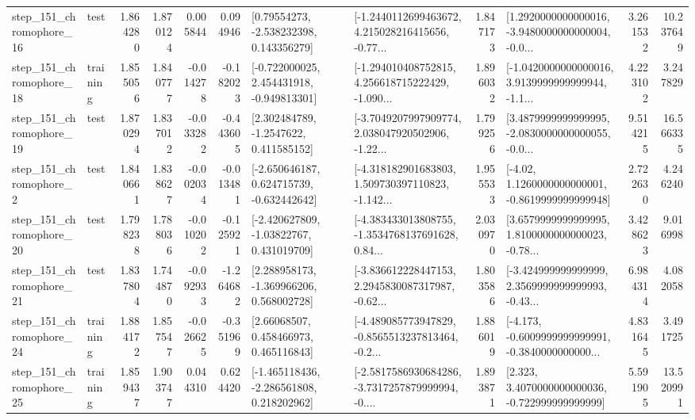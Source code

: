 \begin{tabular}{llrrrrllrlrr}
  step\_151\_chromophore\_16 &      test &      1.864280 &    1.870124 &      0.005844 &  0.094946 &     [0.79554273, -2.538232398, 0.143356279] &  [-1.2440112699463672, 4.215028216415656, -0.77... &       1.847173 &  [1.2920000000000016, -3.9480000000000004, -0.0... &            3.261532 &         10.237649 \\
  step\_151\_chromophore\_18 &  training &      1.855056 &    1.840777 &     -0.014278 & -0.182023 &   [-0.722000025, 2.454431918, -0.949813301] &  [-1.294010408752815, 4.256618715222429, -1.090... &       1.896032 &  [-1.0420000000000016, 3.9139999999999944, -1.1... &            4.223102 &          3.247829 \\
  step\_151\_chromophore\_19 &      test &      1.870294 &    1.837012 &     -0.033282 & -0.443605 &      [2.302484789, -1.2547622, 0.411585152] &  [-3.7049207997909774, 2.038047920502906, -1.22... &       1.799256 &  [3.4879999999999995, -2.0830000000000055, -0.0... &            9.514215 &         16.566335 \\
   step\_151\_chromophore\_2 &      test &      1.840661 &    1.838627 &     -0.002034 & -0.013481 &   [-2.650646187, 0.624715739, -0.632442642] &  [-4.318182901683803, 1.509730397110823, -1.142... &       1.955533 &   [-4.02, 1.1260000000000001, -0.8619999999999948] &            2.722630 &          4.246240 \\
  step\_151\_chromophore\_20 &      test &      1.798238 &    1.788036 &     -0.010202 & -0.125921 &    [-2.420627809, -1.03822767, 0.431019709] &  [-4.383433013808755, -1.3534768137691628, 0.84... &       2.030970 &  [3.6579999999999995, 1.8100000000000023, -0.78... &            3.428623 &          9.016998 \\
  step\_151\_chromophore\_21 &      test &      1.837804 &    1.744870 &     -0.092933 & -1.264682 &    [2.288958173, -1.369966206, 0.568002728] &  [-3.836612228447153, 2.2945830087317987, -0.62... &       1.803586 &  [-3.424999999999999, 2.3569999999999993, -0.43... &            6.984314 &          4.082058 \\
  step\_151\_chromophore\_24 &  training &      1.884172 &    1.857547 &     -0.026625 & -0.351969 &      [2.66068507, 0.458466973, 0.465116843] &  [-4.489085773947829, -0.8565513237813464, -0.2... &       1.886019 &  [-4.173, -0.6009999999999991, -0.3840000000000... &            4.831645 &          3.491725 \\
  step\_151\_chromophore\_25 &  training &      1.859437 &    1.903747 &      0.044310 &  0.624420 &   [-1.465118436, -2.286561808, 0.218202962] &  [-2.5817586930684286, -3.7317257879999994, -0.... &       1.893871 &    [2.323, 3.4070000000000036, -0.722999999999999] &            5.591905 &         13.520991 \\

\end{tabular}
